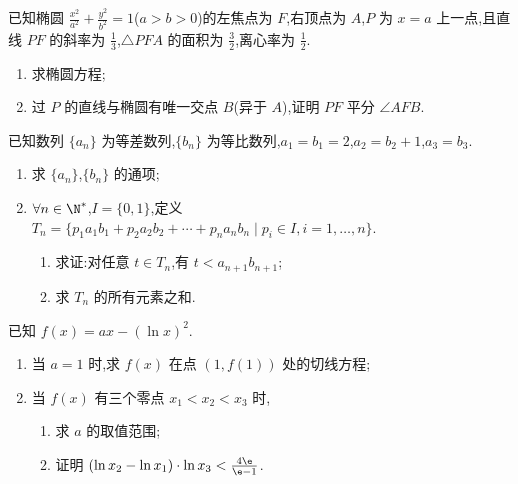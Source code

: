 \begin{problem}
已知椭圆 \(\frac{x^2}{a^2}+\frac{y^2}{b^2}=1\)(\(a>b>0\))的左焦点为 \(F\),右顶点为 \(A\),\(P\) 为 \(x=a\) 上一点,且直线 \(PF\) 的斜率为 \(\frac13\),\(\triangle PFA\) 的面积为 \(\frac32\),离心率为 \(\frac12\).
\begin{enumerate}
\item 求椭圆方程;
\item 过 \(P\) 的直线与椭圆有唯一交点 \(B\)(异于 \(A\)),证明 \(PF\) 平分 \(\angle AFB\).
\end{enumerate}

\end{problem}

\begin{problem}
已知数列 \(\{a_n\}\) 为等差数列,\(\{b_n\}\) 为等比数列,\(a_1=b_1=2\),\(a_2=b_2+1\),\(a_3=b_3\).
\begin{enumerate}
\item 求 \(\{a_n\}\),\(\{b_n\}\) 的通项;
\item \(\forall n\in\N^*\),\(I=\{0,1\}\),定义 \(T_n=\{p_1a_1b_1+p_2a_2b_2+\cdots+p_na_nb_n\mid p_i\in I,i=1,\dots,n\}\).
\begin{enumerate}
\item 求证:对任意 \(t\in T_n\),有 \(t<a_{n+1}b_{n+1}\);
\item 求 \(T_n\) 的所有元素之和.
\end{enumerate}
\end{enumerate}
\end{problem}

\begin{problem}
已知 \(f(x)=ax-(\ln x)^2\).
\begin{enumerate}
\item 当 \(a=1\) 时,求 \(f(x)\) 在点 \((1,f(1))\) 处的切线方程;
\item 当 \(f(x)\) 有三个零点 \(x_1<x_2<x_3\) 时,
\begin{enumerate}
    \item 求 \(a\) 的取值范围;
    \item 证明 \((\ln x_2-\ln x_1)\cdot \ln x_3<\frac{4\e}{\e-1}\).
\end{enumerate}
\end{enumerate}
\end{problem}

